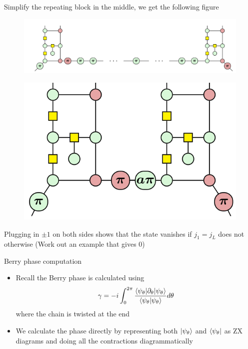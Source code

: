 \documentclass[aspectratio=169,xcolor=dvipsnames, t]{beamer}
\begin{document}
\begin{frame}
    Simplify the repeating block in the middle, we get the following figure
    \begin{figure}
        \includegraphics[width=\textwidth]{figures/zx_hidden_string_order_simplify_zero_projections.png}
    \end{figure}
    \begin{figure}
        \includegraphics[width=.3\textwidth]{figures/zx_hidden_string_order_simplify_zero_projections_final.png}
    \end{figure}
    Plugging in $\pm 1$ on both sides shows that the state vanishes if $j_1 = j_L$ does not otherwise (Work out an example that gives 0)
\end{frame}


\begin{frame}{Berry phase computation}
    \begin{itemize}
        \item Recall the Berry phase is calculated using 
        $$\gamma = -i \int_{0}^{2\pi} \frac{\braket{\psi_\theta| \partial_\theta |\psi_\theta}}{\braket{\psi_\theta|\psi_\theta}} d\theta$$
        where the chain is twisted at the end
        \item We calculate the phase directly by representing both $\ket{\psi_\theta}$ and $\bra{\psi_\theta}$ as ZX diagrams and doing all the contractions diagrammatically
    \end{itemize}
\end{frame}
\end{document}
